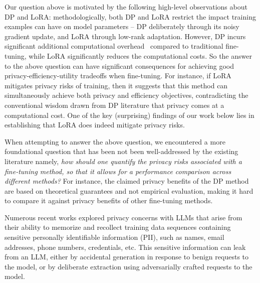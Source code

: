 Our question above is motivated by the following high-level observations about DP and LoRA: methodologically, both DP and LoRA
restrict the impact training examples can have on model parameters -- DP deliberately through its noisy gradient update, and LoRA through low-rank adaptation.  
%
However, DP incurs significant additional computational overhead~\cite{dupuy2022efficient} compared to traditional fine-tuning, while LoRA significantly reduces the computational costs.
%
So the answer to the above question can have significant consequences for achieving good privacy-efficiency-utility tradeoffs when fine-tuning. 
%
For instance, if LoRA mitigates privacy risks of training, then it suggests that this method can simultaneously achieve both privacy and efficiency objectives, contradicting the conventional wisdom drawn from DP literature that privacy comes at a computational cost.
%
One of the key (surprising) findings of our work below lies in establishing that LoRA does indeed mitigate privacy risks.

When attempting to answer the above question, we encountered a more foundational question that has been not been well-addressed by the existing literature namely, \emph{how should one quantify the privacy risks associated with a fine-tuning method, so that it allows for a performance comparison across different methods?} 
%
For instance, the claimed privacy benefits of the DP method are based on theoretical guarantees and not empirical evaluation, making it hard to compare it against privacy benefits of other fine-tuning methods.


%
Numerous recent works explored privacy concerns with LLMs that arise from their ability to memorize and recollect training data sequences containing sensitive personally identifiable information (PII), such as names, email addresses, phone numbers, credentials, etc. 
%
This sensitive information can leak from an LLM, either by accidental generation in response to benign requests to the model, or by deliberate extraction using adversarially crafted requests to the model\cite{mireshghallah-etal-2022-quantifying, mattern2023membership, fu2023practical, kaneko2024sampling, carlini2021extractingtrainingdatalarge, mireshghallah-etal-2022-empirical, panda2024teach}.

